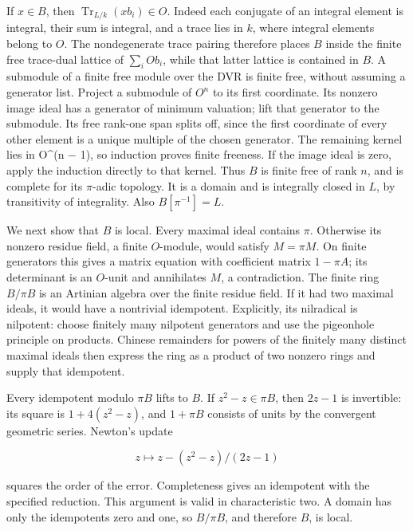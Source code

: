 \documentclass[
  11pt,
]{article}
\begin{document}
If \(x\in B\), then \(\operatorname{Tr}_{L/k}(xb_i)\in O\). Indeed each
conjugate of an integral element is integral, their sum is integral, and
a trace lies in \(k\), where integral elements belong to \(O\). The
nondegenerate trace pairing therefore places \(B\) inside the finite
free trace-dual lattice of \(\sum_i O b_i\), while that latter lattice
is contained in \(B\). A submodule of a finite free module over the DVR
is finite free, without assuming a generator list. Project a submodule
of \(O^n\) to its first coordinate. Its nonzero image ideal has a
generator of minimum valuation; lift that generator to the submodule.
Its free rank-one span splits off, since the first coordinate of every
other element is a unique multiple of the chosen generator. The
remaining kernel lies in O\^{}(n \(-\) 1), so induction proves finite
freeness. If the image ideal is zero, apply the induction directly to
that kernel. Thus \(B\) is finite free of rank \(n\), and is complete
for its \(\pi\)-adic topology. It is a domain and is integrally closed
in \(L\), by transitivity of integrality. Also \(B[\pi^{-1}]=L\).

We next show that \(B\) is local. Every maximal ideal contains \(\pi\).
Otherwise its nonzero residue field, a finite \(O\)-module, would
satisfy \(M=\pi M\). On finite generators this gives a matrix equation
with coefficient matrix \(1-\pi A\); its determinant is an \(O\)-unit
and annihilates \(M\), a contradiction. The finite ring \(B/\pi B\) is
an Artinian algebra over the finite residue field. If it had two maximal
ideals, it would have a nontrivial idempotent. Explicitly, its
nilradical is nilpotent: choose finitely many nilpotent generators and
use the pigeonhole principle on products. Chinese remainders for powers
of the finitely many distinct maximal ideals then express the ring as a
product of two nonzero rings and supply that idempotent.

Every idempotent modulo \(\pi B\) lifts to \(B\). If \(z^2-z\in\pi B\),
then \(2z-1\) is invertible: its square is \(1+4(z^2-z)\), and
\(1+\pi B\) consists of units by the convergent geometric series.
Newton's update

\[
 z\longmapsto z-(z^2-z)/(2z-1)
\]

squares the order of the error. Completeness gives an idempotent with
the specified reduction. This argument is valid in characteristic two. A
domain has only the idempotents zero and one, so \(B/\pi B\), and
therefore \(B\), is local.
\end{document}
